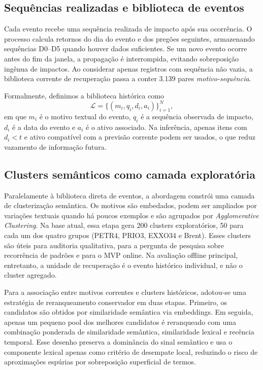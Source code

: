 \documentclass[12pt]{article}
\begin{document}
\subsection{Sequências realizadas e biblioteca de eventos}

Cada evento recebe uma sequência realizada de impacto após sua ocorrência. O processo calcula retornos do dia do evento e dos pregões seguintes, armazenando sequências D0--D5 quando houver dados suficientes. Se um novo evento ocorre antes do fim da janela, a propagação é interrompida, evitando sobreposição ingênua de impactos. Ao considerar apenas registros com sequência não vazia, a biblioteca corrente de recuperação passa a conter 3.139 pares \textit{motivo-sequência}.

Formalmente, definimos a biblioteca histórica como
\[
\mathcal{L} = \{(m_i, q_i, d_i, a_i)\}_{i=1}^{N},
\]
em que $m_i$ é o motivo textual do evento, $q_i$ é a sequência observada de impacto, $d_i$ é a data do evento e $a_i$ é o ativo associado. Na inferência, apenas itens com $d_i < t$ e ativo compatível com a previsão corrente podem ser usados, o que reduz vazamento de informação futura.

\subsection{Clusters semânticos como camada exploratória}

Paralelamente à biblioteca direta de eventos, a abordagem constrói uma camada de clusterização semântica. Os motivos são embedados, podem ser ampliados por variações textuais quando há poucos exemplos e são agrupados por \textit{Agglomerative Clustering}. Na base atual, essa etapa gera 200 clusters exploratórios, 50 para cada um dos quatro grupos (PETR4, PRIO3, EXXO34 e Brent). Esses clusters são úteis para auditoria qualitativa, para a pergunta de pesquisa sobre recorrência de padrões e para o MVP online. Na avaliação offline principal, entretanto, a unidade de recuperação é o evento histórico individual, e não o cluster agregado.

Para a associação entre motivos correntes e clusters históricos, adotou-se uma estratégia de reranqueamento conservador em duas etapas. Primeiro, os candidatos são obtidos por similaridade semântica via embeddings. Em seguida, apenas um pequeno pool dos melhores candidatos é reranqueado com uma combinação ponderada de similaridade semântica, similaridade lexical e recência temporal. Esse desenho preserva a dominância do sinal semântico e usa o componente lexical apenas como critério de desempate local, reduzindo o risco de aproximações espúrias por sobreposição superficial de termos.
\end{document}
